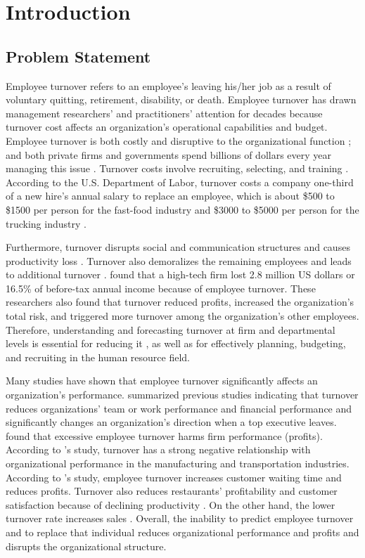 \chapter{Introduction} \label{ch:introduction}
\section{Problem Statement}
Employee turnover refers to an employee's leaving his/her job as a result of voluntary quitting, retirement, disability, or death. Employee turnover has drawn management researchers' and practitioners' attention for decades because turnover cost affects an organization's operational capabilities and budget. Employee turnover is both costly and disruptive to the organizational function \citep{kacmar2006, mueller1989,staw1980}; and both private firms and governments spend billions of dollars every year managing this issue \citeyearpar{leonard2001}. %
Turnover costs involve recruiting, selecting, and training \citep{mobley1982, staw1980}. According to the U.S. Department of Labor, turnover costs a company one-third of a new hire's annual salary to replace an employee, which is about \$500 to \$1500 per person for the fast-food industry and \$3000 to \$5000 per person for the trucking industry \citep{white1995}. 

Furthermore, turnover disrupts social and communication structures and causes productivity loss \citep{mobley1982}. Turnover also demoralizes the remaining employees and leads to additional turnover \citep{staw1980}. \citet{sagie2002} found that a high-tech firm lost 2.8 million US dollars or 16.5\% of before-tax annual income because of employee turnover. These researchers also found that turnover reduced profits, increased the organization's total risk, and triggered more turnover among the organization's other employees. Therefore, understanding and forecasting turnover at firm and departmental levels is essential for reducing it \citep{kacmar2006}, as well as for effectively planning, budgeting, and recruiting in the human resource field. 

Many studies have shown that employee turnover significantly affects an organization's performance. \citet{staw1980} summarized previous studies indicating that turnover reduces organizations' team or work performance and financial performance and significantly changes an organization's direction when a top executive leaves. \citet{glebbeek2004} found that excessive employee turnover harms firm performance (profits). According to \citet{hancock2013}'s study, turnover has a strong negative relationship with organizational performance in the manufacturing and transportation industries. According to \citet{kacmar2006}'s study, employee turnover increases customer waiting time and reduces profits. Turnover also reduces restaurants' profitability and customer satisfaction because of declining productivity \citep{detert2007}. On the other hand, the lower turnover rate increases sales \citep{batt2002}. Overall, the inability to predict employee turnover and to replace that individual reduces organizational performance and profits and disrupts the organizational structure.

